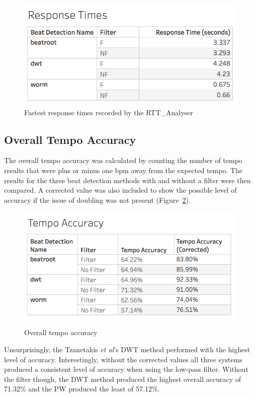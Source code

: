 \documentclass[a4paper, 11pt]{article}
\begin{document}
\begin{figure}[ht]
\centering
\includegraphics[scale=0.3]{images/ResponseTime.jpg}
\caption{Fastest response times recorded by the RTT\_Analyser}
\label{fig: resTime}
\end{figure}

\subsection{Overall Tempo Accuracy}
The overall tempo accuracy was calculated by counting the number of tempo results that were plus or minus one bpm away from the expected tempo. The results for the three beat detection methods with and without a filter were then compared. A corrected value was also included to show the possible level of accuracy if the issue of doubling was not present (Figure~\ref{fig: OTA}).

\begin{figure}[h]
\centering
\includegraphics[scale=0.35]{images/TempoAcc.jpg}
\caption{Overall tempo accuracy}
\label{fig: OTA}
\end{figure}

Unsurprisingly, the Tzanetakis \textit{et al}'s \cite{tzane1} DWT method performed with the highest level of accuracy. Interestingly, without the corrected values all three systems produced a consistent level of accuracy when using the low-pass filter. Without the filter though, the DWT method produced the highest overall accuracy of 71.32\% and the PW produced the least of 57.12\%.\par
\end{document}
